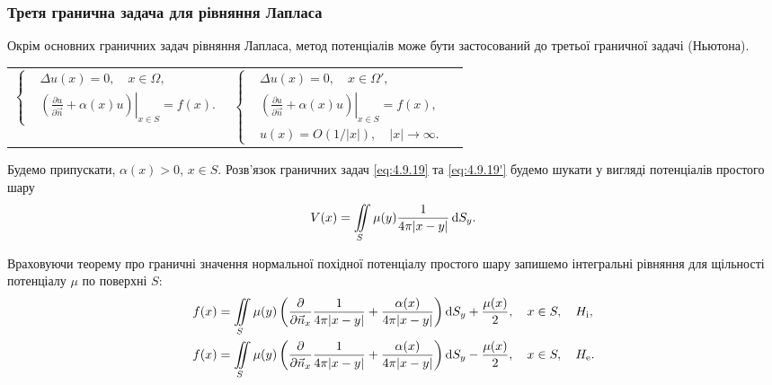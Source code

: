\subsubsection{Третя гранична задача для рівняння Лапласа}

Окрім основних граничних задач рівняння Лапласа, метод потенціалів може бути застосований до третьої граничної задачі (Ньютона).
\begin{longtable}{p{} p{}p{}}
	\parbox{.45\textwidth}{\begin{equation}\label{eq:4.9.19}\left\{\begin{aligned}
		& \Delta u(x) = 0, \quad x \in \Omega, \\
		& \left. \left( \frac{\partial u}{\partial \vec n} + \alpha(x) u \right) \right|_{x \in S} = f(x).
	\end{aligned}\right.\end{equation}} & \parbox{.45\textwidth}{\begin{equation}\label{eq:4.9.19'}\left\{\begin{aligned}
		& \Delta u(x) = 0, \quad x \in \Omega', \\
		& \left. \left( \frac{\partial u}{\partial \vec n} + \alpha(x) u \right) \right|_{x \in S} = f(x), \\
		& u(x) = O(1/|x|), \quad |x| \to \infty.
	\end{aligned}\right.\end{equation}}
\end{longtable}

Будемо припускати, $\alpha(x) > 0$, $x \in S$. Розв'язок граничних задач \eqref{eq:4.9.19} та \eqref{eq:4.9.19'} будемо шукати у вигляді потенціалів простого шару
\begin{equation}
	V(x) = \displaystyle\iint\limits_S \mu(y) \frac{1}{4 \pi |x - y|} \mathop{}\!\mathrm{d} S_y.
\end{equation}

Враховуючи теорему про граничні значення нормальної похідної потенціалу простого шару запишемо інтегральні рівняння для щільності потенціалу $\mu$ по поверхні $S$:
\begin{align}
	\label{eq:4.9.20}
	f(x) &= \displaystyle\iint\limits_S \mu(y) \left( \frac{\partial}{\partial \vec n_x} \frac{1}{4 \pi |x - y|} + \frac{\alpha(x)}{4 \pi |x - y|} \right) \mathop{}\!\mathrm{d} S_y + \frac{\mu(x)}{2}, \quad x \in S, \quad H_{\text{i}}, \\
	\label{eq:4.9.20'}
	f(x) &= \displaystyle\iint\limits_S \mu(y) \left( \frac{\partial}{\partial \vec n_x} \frac{1}{4 \pi |x - y|} + \frac{\alpha(x)}{4 \pi |x - y|} \right) \mathop{}\!\mathrm{d} S_y - \frac{\mu(x)}{2}, \quad x \in S, \quad H_{\text{e}}.
\end{align}

